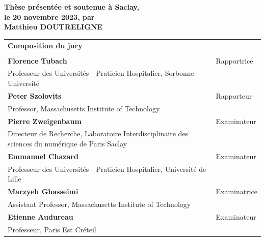 \documentclass[french,12pt,twoside,a4paper]{book}
\begin{document}
\begin{titlepage}
  \textbf{Thèse présentée et soutenue à Saclay,\\ le 20 novembre 2023, par}\\
  \bigskip
  \Large {\color{Prune} \textbf{Matthieu DOUTRELIGNE}}


  \vspace{\fill} %

  \bigskip

  \flushleft

  \scriptsize
  \begin{tabular}{|p{9cm}l}
    \arrayrulecolor{Prune}
    {\footnotesize \textbf{Composition du jury}}                                                                    \\
                                                                                                     &              \\
    \textbf{Florence Tubach}                                                                         & Rapportrice  \\
    Professeur des Universités - Praticien Hospitalier, Sorbonne Université                          &              \\
    \textbf{Peter Szolovits}                                                                         & Rapporteur   \\
    Professor, Massachusetts Institute of Technology                                                 &              \\
    \textbf{Pierre Zweigenbaum}                                                                      & Examinateur  \\
    Directeur de Recherche, Laboratoire Interdisciplinaire des sciences du numérique de Paris Saclay &              \\
    \textbf{Emmanuel Chazard}                                                                        & Examinateur  \\
    Professeur des Universités - Praticien Hospitalier, Université de Lille                          &              \\
    \textbf{Marzyeh Ghasseimi}                                                                       & Examinatrice \\
    Assistant Professor, Massachusetts Institute of Technology                                       &              \\
    \textbf{Etienne Audureau}                                                                        & Examinateur  \\
    Professeur, Paris Est Créteil                                                                    &              \\
  \end{tabular}


\end{titlepage}
\end{document}
